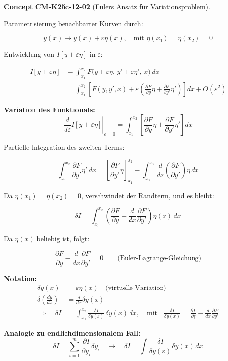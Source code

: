 \documentclass[10pt, letterpaper]{article}
\newcommand{\CustomHeading}[3]{%
  \par\medskip\noindent%
  \textbf{#1 #2} \textnormal{(#3)}.\enskip%
}
\newenvironment{CONC}[2]{\begin{unitbox}\CustomHeading{Concept}{#1}{#2}}{\end{unitbox}}
\begin{document}
\begin{CONC}{CM-K25c-12-02}{Eulers Ansatz für Variationsproblem}
Parametrisierung benachbarter Kurven durch:

\[
y(x) \longrightarrow y(x) + \varepsilon \eta(x), \quad \text{mit } \eta(x_1) = \eta(x_2) = 0
\]

Entwicklung von \( I[y + \varepsilon \eta] \) in \( \varepsilon \):

\begin{align*}
I[y + \varepsilon \eta] &= \int_{x_1}^{x_2} F\big(y + \varepsilon \eta, \, y' + \varepsilon \eta', \, x\big)\, dx \\
&= \int_{x_1}^{x_2} \left[ F(y, y', x) + \varepsilon \left( \frac{\partial F}{\partial y}\eta + \frac{\partial F}{\partial y'}\eta' \right) \right] dx + O(\varepsilon^2)
\end{align*}

\textbf{Variation des Funktionals:}
\[
\left. \frac{d}{d\varepsilon} I[y + \varepsilon \eta] \right|_{\varepsilon=0} = \int_{x_1}^{x_2} \left[ \frac{\partial F}{\partial y} \eta + \frac{\partial F}{\partial y'} \eta' \right] dx
\]

Partielle Integration des zweiten Terms:

\[
\int_{x_1}^{x_2} \frac{\partial F}{\partial y'} \eta'\, dx = 
\left[ \frac{\partial F}{\partial y'} \eta \right]_{x_1}^{x_2}
- \int_{x_1}^{x_2} \frac{d}{dx} \left( \frac{\partial F}{\partial y'} \right) \eta\, dx
\]

Da \( \eta(x_1) = \eta(x_2) = 0 \), verschwindet der Randterm, und es bleibt:

\[
\delta I = \int_{x_1}^{x_2} \left( \frac{\partial F}{\partial y} - \frac{d}{dx} \frac{\partial F}{\partial y'} \right) \eta(x)\, dx
\]

Da \( \eta(x) \) beliebig ist, folgt:

\[
\boxed{
\frac{\partial F}{\partial y} - \frac{d}{dx} \frac{\partial F}{\partial y'} = 0
}
\qquad \text{(Euler-Lagrange-Gleichung)}
\]

\vspace{1em}
\textbf{Notation:}
\begin{align*}
\delta y(x) &= \varepsilon \eta(x) \quad \text{(virtuelle Variation)} \\
\delta \left( \frac{dy}{dx} \right) &= \frac{d}{dx} \delta y(x) \\
\Rightarrow \quad \delta I &= \int_{x_1}^{x_2} \frac{\delta I}{\delta y(x)}\, \delta y(x)\, dx, \quad 
\text{mit} \quad \frac{\delta I}{\delta y(x)} = \frac{\partial F}{\partial y} - \frac{d}{dx} \frac{\partial F}{\partial y'}
\end{align*}

\vspace{0.5em}
\textbf{Analogie zu endlichdimensionalem Fall:}
\[
\delta I = \sum_{i=1}^m \frac{\partial I}{\partial y_i} \delta y_i \quad 
\longrightarrow \quad 
\delta I = \int \frac{\delta I}{\delta y(x)} \delta y(x)\, dx
\]
\end{CONC}
\end{document}
